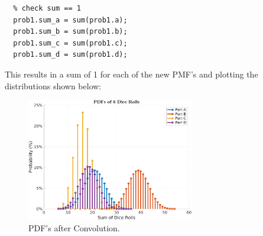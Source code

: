 \documentclass[11pt]{article}
\begin{document}
\begin{enumerate}[label=\textbf{\arabic*.}]
\begin{lstlisting}
  % check sum == 1
  prob1.sum_a = sum(prob1.a);
  prob1.sum_b = sum(prob1.b);
  prob1.sum_c = sum(prob1.c);
  prob1.sum_d = sum(prob1.d);
  \end{lstlisting}
  This results in a sum of 1 for each of the new PMF's and plotting the 
  distributions shown below:
  \begin{figure}[H]
    \centering
    \includegraphics[width=0.65\textwidth]{p1.png}
    \caption{PDF's after Convolution.}
  \end{figure}


\end{enumerate}
\end{document}
